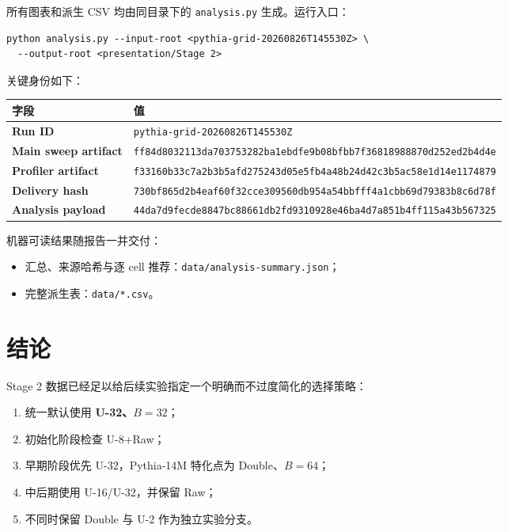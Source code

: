 \documentclass[11pt,a4paper]{ctexart}
\newcommand{\method}[1]{\textsf{#1}}
\newcommand{\key}[1]{\textcolor{emphasis}{\textbf{#1}}}
\newcommand{\sourceid}[1]{\texttt{\small #1}}
\begin{document}
所有图表和派生 CSV 均由同目录下的 \sourceid{analysis.py} 生成。运行入口：

\begin{verbatim}
python analysis.py --input-root <pythia-grid-20260826T145530Z> \
  --output-root <presentation/Stage 2>
\end{verbatim}

关键身份如下：

\begin{longtable}{>{\bfseries}p{4.3cm}p{10.2cm}}
  \toprule
  字段 & 值 \\
  \midrule
  Run ID & \sourceid{pythia-grid-20260826T145530Z} \\
  Main sweep artifact & \nolinkurl{ff84d8032113da703753282ba1ebdfe9b08bfbb7f36818988870d252ed2b4d4e} \\
  Profiler artifact & \nolinkurl{f33160b33c7a2b3b5afd275243d05e5fb4a48b24d42c3b5ac58e1d14e1174879} \\
  Delivery hash & \nolinkurl{730bf865d2b4eaf60f32cce309560db954a54bbfff4a1cbb69d79383b8c6d78f} \\
  Analysis payload & \nolinkurl{44da7d9fecde8847bc88661db2fd9310928e46ba4d7a851b4ff115a43b567325} \\
  \bottomrule
\end{longtable}

机器可读结果随报告一并交付：
\begin{itemize}
  \item 汇总、来源哈希与逐 cell 推荐：\sourceid{data/analysis-summary.json}；
  \item 完整派生表：\sourceid{data/*.csv}。
\end{itemize}

\section{结论}

Stage 2 数据已经足以给后续实验指定一个明确而不过度简化的选择策略：

\begin{enumerate}
  \item 统一默认使用 \key{U-32、$B=32$}；
  \item 初始化阶段检查 \method{U-8}+\method{Raw}；
  \item 早期阶段优先 \method{U-32}，Pythia-14M 特化点为
    \method{Double}、$B=64$；
  \item 中后期使用 \method{U-16}/\method{U-32}，并保留 Raw；
  \item 不同时保留 Double 与 U-2 作为独立实验分支。
\end{enumerate}
\end{document}
